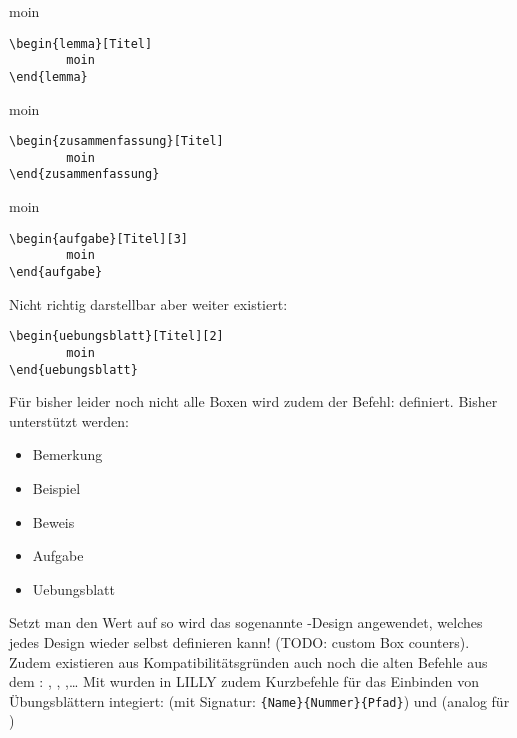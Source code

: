 {\begin{multicols}{2}
\begingroup\begin{lemma}[Titel]
moin
\begin{lstlisting}[style=latex]
\begin{lemma}[Titel]
        moin
\end{lemma}\end{lstlisting}
\end{lemma}\endgroup

\begingroup\begin{zusammenfassung}[Titel]
moin
\begin{lstlisting}[style=latex]
\begin{zusammenfassung}[Titel]
        moin
\end{zusammenfassung}\end{lstlisting}
\end{zusammenfassung}\endgroup

\begingroup\begin{aufgabe}[Titel][3]
moin
\begin{lstlisting}[style=latex]
\begin{aufgabe}[Titel][3]
        moin
\end{aufgabe}\end{lstlisting}
\end{aufgabe}\endgroup

Nicht richtig darstellbar aber weiter existiert:
\begin{lstlisting}[style=latex]
\begin{uebungsblatt}[Titel][2]
        moin
\end{uebungsblatt}\end{lstlisting}

\end{multicols}}
Für bisher leider noch nicht alle Boxen wird zudem der Befehl:  definiert. Bisher unterstützt werden:
\begin{multicols}{3}
    \begin{itemize}[label=$\diamond$]\narrowitems
        \item Bemerkung
        \item Beispiel
        \item Beweis
        \item Aufgabe
        \item Uebungsblatt
    \end{itemize}
\end{multicols}
Setzt man den Wert auf  so wird das sogenannte -Design angewendet, welches jedes Design wieder selbst definieren kann! (TODO: custom Box counters).\newline
Zudem existieren aus Kompatibilitätsgründen auch noch die alten Befehle aus dem : , , ,\ldots\medskip\newline
Mit  wurden in LILLY zudem Kurzbefehle für das Einbinden von Übungsblättern integiert:
 (mit Signatur: \verb|{Name}{Nummer}{Pfad}|) und  (analog für )\normalfont


